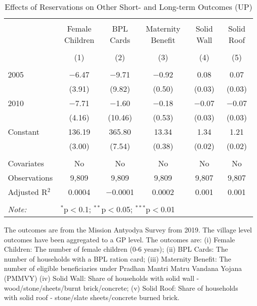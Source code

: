 \begin{table}[!htbp]
\centering
\begin{threeparttable}

  \caption{Effects of Reservations on Other Short- and Long-term Outcomes (UP)} 
  \label{up_shrug_other_05_10} 
\scriptsize 
\begin{tabular}{@{\extracolsep{0pt}}lccccc} 
\\[-1.8ex]\hline 
\hline \\[-1.8ex] 
 & Female Children & BPL Cards & Maternity Benefit & Solid Wall & Solid Roof \\ 
\\[-1.8ex] & (1) & (2) & (3) & (4) & (5)\\ 
\hline \\[-1.8ex] 
 2005 & $-$6.47 & $-$9.71 & $-$0.92 & 0.08 & 0.07 \\ 
  & (3.91) & (9.82) & (0.50) & (0.03) & (0.03) \\ 
  2010 & $-$7.71 & $-$1.60 & $-$0.18 & $-$0.07 & $-$0.07 \\ 
  & (4.16) & (10.46) & (0.53) & (0.03) & (0.03) \\ 
  Constant & 136.19 & 365.80 & 13.34 & 1.34 & 1.21 \\ 
  & (3.00) & (7.54) & (0.38) & (0.02) & (0.02) \\ 
 \hline \\[-1.8ex] 
Covariates & No & No & No & No & No \\ 
Observations & 9,809 & 9,809 & 9,809 & 9,807 & 9,807 \\ 
Adjusted R$^{2}$ & 0.0004 & $-$0.0001 & 0.0002 & 0.001 & 0.001 \\ 
\hline 
\hline \\[-1.8ex] 
\textit{Note:}  & \multicolumn{5}{l}{$^{*}$p$<$0.1; $^{**}$p$<$0.05; $^{***}$p$<$0.01} \\ 
\end{tabular} 
\begin{tablenotes}[flushleft]
\scriptsize
\item The outcomes are from the Mission Antyodya Survey from 2019. 
                   The village level outcomes have been aggregated to a GP level. The outcomes are: 
                     (i) Female Children: The number of female children (0-6 years);
                     (ii) BPL Cards: The number of households with a BPL ration card;
                     (iii) Maternity Benefit: The number of eligible beneficiaries under Pradhan Mantri Matru Vandana Yojana (PMMVY)
                     (iv) Solid Wall: Share of households with solid wall - wood/stone/sheets/burnt brick/concrete;
                     (v) Solid Roof: Share of households with solid roof - stone/slate sheets/concrete burned brick.
\end{tablenotes}
\end{threeparttable}
\end{table}
